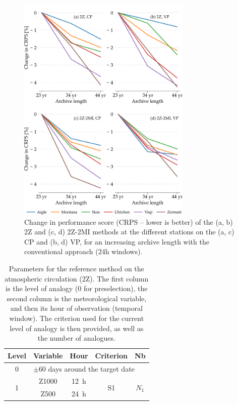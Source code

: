 \documentclass[hess, manuscript]{copernicus}
\begin{document}
	\begin{figure}[htb]
		\includegraphics[width=8.3cm]{fig13.pdf}
		\caption{Change in performance score (CRPS -- lower is better) of the (a, b) 2Z and (c, d) 2Z-2MI methods at the different stations on the (a, c) CP and (b, d) VP, for an increasing archive length with the conventional approach (24h windows).}
		\label{fig:plots_archive_length}
	\end{figure}
	
	
	\clearpage
	
	
	\begin{table}[htb]
		\caption{Parameters for the reference method on the atmospheric circulation (2Z). The first column is the level of analogy (0 for preselection), the second column is the meteorological variable, and then its hour of observation (temporal window). The criterion used for the current level of analogy is then provided, as well as the number of analogues.}
		\footnotesize
		\begin{center}
			\begin{tabular}{ccccc}
				\hline
				Level & Variable & Hour & Criterion & Nb \\ 
				\hline 
				0 & \multicolumn{4}{l}{$\pm 60$ days around the target date} \\
				\hline 
				\multirow{2}{*}{1} & Z1000 & 12~h & \multirow{2}{*}{S1} & \multirow{2}{*}{$N_{1}$} \\
				& Z500 & 24~h & & \\ 
				\hline 
			\end{tabular} 
		\end{center}
		\label{table:method_2Z}
	\end{table}
	
\end{document}
